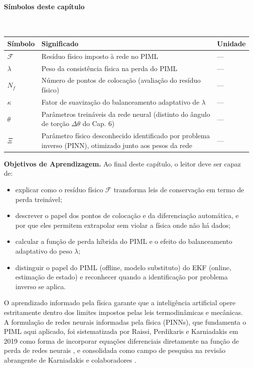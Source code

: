 \documentclass[12pt,a4paper]{article}
\numberwithin{equation}{section}
\numberwithin{table}{section}
\numberwithin{figure}{section}
\begin{document}
{\paragraph{Símbolos deste capítulo}\mbox{}\\[-0.5em]
{\small
\begin{longtable}{>{\raggedright\arraybackslash}p{2.6cm} >{\raggedright\arraybackslash}p{9.2cm} >{\raggedright\arraybackslash}p{2.6cm}}
	\toprule
	\textbf{Símbolo} & \textbf{Significado} & \textbf{Unidade} \\ \midrule
	\endhead
	$\mathcal{F}$ & Resíduo físico imposto à rede no PIML & --- \\
	$\lambda$ & Peso da consistência física na perda do PIML & --- \\
	$N_f$ & Número de pontos de colocação (avaliação do resíduo físico) & --- \\
	$\kappa$ & Fator de suavização do balanceamento adaptativo de $\lambda$ & --- \\
	$\theta$\dag & Parâmetros treináveis da rede neural (distinto do ângulo de torção $\Delta\theta$ do Cap. 6) & --- \\
	$\Xi$ & Parâmetro físico desconhecido identificado por problema inverso (PINN), otimizado junto aos pesos da rede & --- \\
	\bottomrule
\end{longtable}
}

	\textbf{Objetivos de Aprendizagem.} Ao final deste capítulo, o leitor
	deve ser capaz de:
	\begin{itemize}
		\item explicar como o resíduo físico $\mathcal{F}$ transforma leis
		de conservação em termo de perda treinável;
		\item descrever o papel dos pontos de colocação e da
		diferenciação automática, e por que eles permitem extrapolar sem
		violar a física onde não há dados;
		\item calcular a função de perda híbrida do PIML e o efeito do
		balanceamento adaptativo do peso $\lambda$;
		\item distinguir o papel do PIML (offline, modelo substituto) do
		EKF (online, estimação de estado) e reconhecer quando a
		identificação por problema inverso se aplica.
	\end{itemize}

	O aprendizado informado pela física garante que a inteligência artificial opere estritamente dentro dos limites impostos pelas leis termodinâmicas e mecânicas. A formulação de redes neurais informadas pela física (PINNs), que fundamenta o PIML aqui aplicado, foi sistematizada por Raissi, Perdikaris e Karniadakis em 2019 como forma de incorporar equações diferenciais diretamente na função de perda de redes neurais \cite{piml}, e consolidada como campo de pesquisa na revisão abrangente de Karniadakis e colaboradores \cite{piml2}.
	
}
\end{document}
